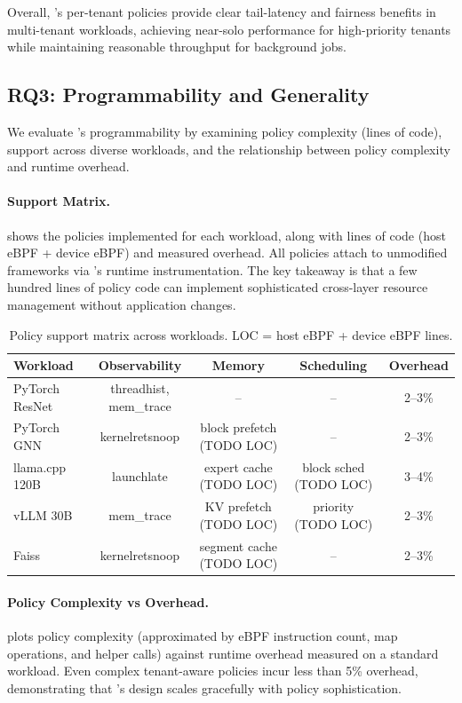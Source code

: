 Overall, \sys's per-tenant policies provide clear tail-latency and fairness benefits in multi-tenant workloads, achieving near-solo performance for high-priority tenants while maintaining reasonable throughput for background jobs.

\subsection{RQ3: Programmability and Generality}

We evaluate \sys's programmability by examining policy complexity (lines of code), support across diverse workloads, and the relationship between policy complexity and runtime overhead.

\paragraph{Support Matrix.}
 shows the policies implemented for each workload, along with lines of code (host eBPF + device eBPF) and measured overhead. All policies attach to unmodified frameworks via \sys's runtime instrumentation. The key takeaway is that a few hundred lines of policy code can implement sophisticated cross-layer resource management without application changes.

\begin{table}[t]
\centering
\small
\caption{Policy support matrix across workloads. LOC = host eBPF + device eBPF lines.}
\label{tab:support-matrix}
\begin{tabular}{lcccc}
\toprule
\textbf{Workload} & \textbf{Observability} & \textbf{Memory} & \textbf{Scheduling} & \textbf{Overhead} \\
\midrule
PyTorch ResNet & threadhist, mem\_trace & -- & -- & 2--3\% \\
PyTorch GNN & kernelretsnoop & block prefetch (TODO LOC) & -- & 2--3\% \\
llama.cpp 120B & launchlate & expert cache (TODO LOC) & block sched (TODO LOC) & 3--4\% \\
vLLM 30B & mem\_trace & KV prefetch (TODO LOC) & priority (TODO LOC) & 2--3\% \\
Faiss & kernelretsnoop & segment cache (TODO LOC) & -- & 2--3\% \\
\bottomrule
\end{tabular}
\end{table}

\paragraph{Policy Complexity vs Overhead.}
 plots policy complexity (approximated by eBPF instruction count, map operations, and helper calls) against runtime overhead measured on a standard workload. Even complex tenant-aware policies incur less than 5\% overhead, demonstrating that \sys's design scales gracefully with policy sophistication.

